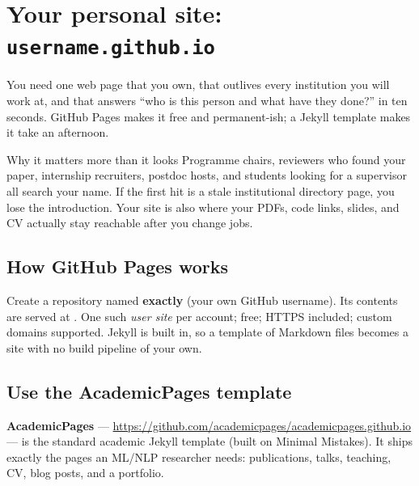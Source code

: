 \documentclass[11pt,a4paper]{article}
\begin{document}
\section{Your personal site: \texttt{username.github.io}}
\label{sec:website}

You need one web page that you own, that outlives every institution you will
work at, and that answers ``who is this person and what have they done?'' in
ten seconds. GitHub Pages makes it free and permanent-ish; a Jekyll template
makes it take an afternoon.

\begin{cbox}{Why it matters more than it looks}
Programme chairs, reviewers who found your paper, internship recruiters,
postdoc hosts, and students looking for a supervisor all search your name. If
the first hit is a stale institutional directory page, you lose the
introduction. Your site is also where your PDFs, code links, slides, and CV
actually stay reachable after you change jobs.
\end{cbox}

\subsection{How GitHub Pages works}

Create a repository named \textbf{exactly}  (your own
GitHub username). Its contents are served at
. One such \emph{user site} per account; free;
HTTPS included; custom domains supported. Jekyll is built in, so a template of
Markdown files becomes a site with no build pipeline of your own.

\subsection{Use the AcademicPages template}

\textbf{AcademicPages} --- \url{https://github.com/academicpages/academicpages.github.io}
--- is the standard academic Jekyll template (built on Minimal Mistakes). It
ships exactly the pages an ML/NLP researcher needs: publications, talks,
teaching, CV, blog posts, and a portfolio.
\end{document}
